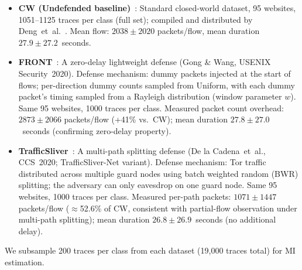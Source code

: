 \documentclass[lettersize,journal]{IEEEtran}
\begin{document}
\begin{itemize}
\item \textbf{CW (Undefended baseline)}~\cite{sirinam2018deep}:
  Standard closed-world dataset, 95 websites, 1051--1125 traces per class
  (full set); compiled and distributed by Deng~et~al.~\cite{deng2024earlystage}.
  Mean flow: $2038\pm 2020$ packets/flow, mean duration $27.9\pm27.2$~seconds.

\item \textbf{FRONT}~\cite{gong2020zero}:
  A zero-delay lightweight defense (Gong \& Wang, USENIX Security~2020).
  Defense mechanism: dummy packets injected at the start of flows; per-direction
  dummy counts sampled from Uniform, with each dummy packet's timing sampled
  from a Rayleigh distribution (window parameter $w$).
  Same 95 websites, 1000 traces per class.
  Measured packet count overhead: $2873\pm 2066$ packets/flow
  (+41\% vs.\ CW); mean duration $27.8\pm 27.0$~seconds (confirming
  zero-delay property).

\item \textbf{TrafficSliver}~\cite{delacadena2020trafficsliver}:
  A multi-path splitting defense (De la Cadena~et~al., CCS~2020;
  TrafficSliver-Net variant).
  Defense mechanism: Tor traffic distributed across multiple guard nodes
  using batch weighted random (BWR) splitting; the adversary can only
  eavesdrop on one guard node.
  Same 95 websites, 1000 traces per class.
  Measured per-path packets: $1071\pm 1447$ packets/flow ($\approx$52.6\%
  of CW, consistent with partial-flow observation under multi-path splitting);
  mean duration $26.8\pm 26.9$~seconds (no additional delay).
\end{itemize}

We subsample 200 traces per class from each dataset (19,000 traces total)
for MI estimation.
\end{document}
